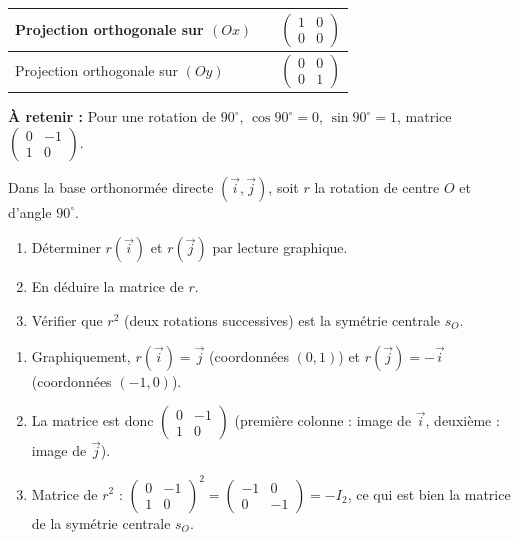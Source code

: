 \documentclass[11pt]{article}
\begin{document}
\begin{propriete}
\begin{center}
\begin{tabularx}{\linewidth}{|l|X|X|}
Projection orthogonale sur $(Ox)$ & & $\begin{pmatrix} 1 & 0 \\ 0 & 0 \end{pmatrix}$ \\ \hline
Projection orthogonale sur $(Oy)$ & & $\begin{pmatrix} 0 & 0 \\ 0 & 1 \end{pmatrix}$ \\ \hline
\end{tabularx}
\end{center}
\textbf{À retenir :} Pour une rotation de $90^\circ$, $\cos90^\circ=0$, $\sin90^\circ=1$, matrice $\begin{pmatrix} 0 & -1 \\ 1 & 0 \end{pmatrix}$.
\end{propriete}

\begin{experience}
Dans la base orthonormée directe $(\vec{i},\vec{j})$, soit $r$ la rotation de centre $O$ et d'angle $90^\circ$.
\begin{enumerate}
\item Déterminer $r(\vec{i})$ et $r(\vec{j})$ par lecture graphique.
\item En déduire la matrice de $r$.
\item Vérifier que $r^2$ (deux rotations successives) est la symétrie centrale $s_O$.
\end{enumerate}
\tcblower
\begin{enumerate}
\item Graphiquement, $r(\vec{i})=\vec{j}$ (coordonnées $(0,1)$) et $r(\vec{j})=-\vec{i}$ (coordonnées $(-1,0)$).
\item La matrice est donc $\begin{pmatrix} 0 & -1 \\ 1 & 0 \end{pmatrix}$ (première colonne : image de $\vec{i}$, deuxième : image de $\vec{j}$).
\item Matrice de $r^2$ : $\begin{pmatrix} 0 & -1 \\ 1 & 0 \end{pmatrix}^2 = \begin{pmatrix} -1 & 0 \\ 0 & -1 \end{pmatrix} = -I_2$, ce qui est bien la matrice de la symétrie centrale $s_O$.
\end{enumerate}
\end{experience}
\end{document}
